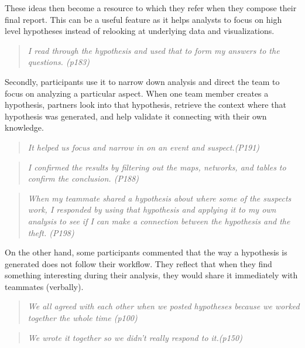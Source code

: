 These ideas then become a resource to which they refer when they compose their final report. This can be a useful feature as it helps analysts to focus on high level hypotheses instead of relooking at underlying data and visualizations. 

\begin{quote}
	\emph{I read through the hypothesis and used that to form my answers to the questions. (p183)}
\end{quote}


Secondly, participants use it to narrow down analysis and direct the team to focus on analyzing a particular aspect. When one team member creates a hypothesis, partners look into that hypothesis, retrieve the context where that hypothesis was generated, and help validate it connecting with their own knowledge. 

\begin{quote}
	\emph{It helped us focus and narrow in on an event and suspect.(P191)}
\end{quote}
\begin{quote}
	\emph{I confirmed the results by filtering out the maps, networks, and tables to confirm the conclusion. (P188)}
\end{quote}
\begin{quote}
	\emph{When my teammate shared a hypothesis about where some of the suspects work, I responded by using that hypothesis and applying it to my own analysis to see if I can make a connection between the hypothesis and the theft. (P198)}
\end{quote}


On the other hand, some participants commented that the way a hypothesis is generated does not follow their workflow. They reflect that when they find something interesting during their analysis, they would share it immediately with teammates (verbally). 

\begin{quote}
	\emph{We all agreed with each other when we posted hypotheses because we worked together the whole time (p100)}
\end{quote}

\begin{quote}
	\emph{We wrote it together so we didn’t really respond to it.(p150)}
\end{quote}

